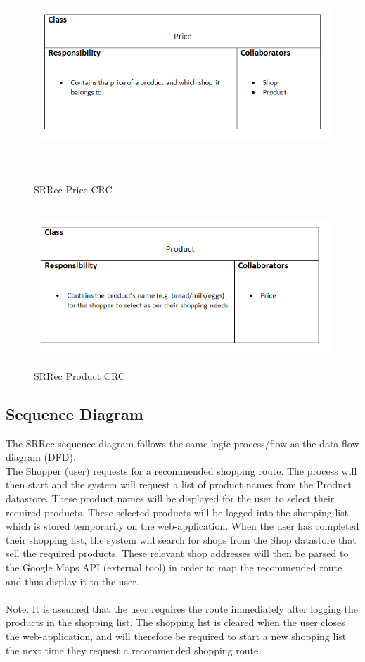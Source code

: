 \documentclass[12pt]{article}
\begin{document}
\begin{figure}[H]
  \includegraphics[width=\textwidth ,height=8cm]{PriceCRC.png}
  \centering
  \caption{SRRec Price CRC}
  \label{fig:Price CRC}
\end{figure}

\begin{figure}[H]
  \includegraphics[width=\textwidth ,height=6cm]{ProductCRC.png}
  \centering
  \caption{SRRec Product CRC}
  \label{fig:Product CRC}
\end{figure}

\subsection{Sequence Diagram}
The SRRec sequence diagram follows the same logic process/flow as the data flow diagram (DFD).
\\
The Shopper (user) requests for a recommended shopping route. The process will then start and the system will request a list of product names from the Product datastore. These product names will be displayed for the user to select their required products. These selected products will be logged into the shopping list, which is stored temporarily on the web-application. When the user has completed their shopping list, the system will search for shops from the Shop datastore that sell the required products. These relevant shop addresses will then be parsed to the Google Maps API (external tool) in order to map the recommended route and thus display it to the user.
\\\\
Note: It is assumed that the user requires the route immediately after logging the products in the shopping list. The shopping list is cleared when the user closes the web-application, and will therefore be required to start a new shopping list the next time they request a recommended shopping route.\\
\end{document}
